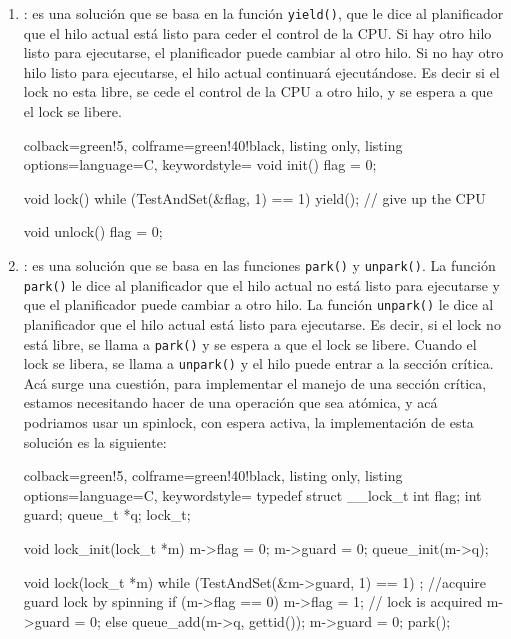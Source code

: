 \documentclass[openany]{book}
\begin{document}
\begin{enumerate}
    \item {}: es una solución que se basa en la función \texttt{yield()}, que le dice al planificador que el hilo actual está listo para ceder el control de la CPU. Si hay otro hilo listo para ejecutarse, el planificador puede cambiar al otro hilo. Si no hay otro hilo listo para ejecutarse, el hilo actual continuará ejecutándose. Es decir si el lock no esta libre, se cede el control de la CPU a otro hilo, y se espera a que el lock se libere.
    \begin{tcblisting}{colback=green!5, colframe=green!40!black, listing only, listing options={language=C, keywordstyle=\color{blue!35!white}\bfseries}}
    void init() {
        flag = 0;
    }
            
    void lock() {
        while (TestAndSet(&flag, 1) == 1)
            yield(); // give up the CPU
    }
            
    void unlock() {
        flag = 0;
    }
    \end{tcblisting}
    \item {}: es una solución que se basa en las funciones \texttt{park()} y \texttt{unpark()}. La función \texttt{park()} le dice al planificador que el hilo actual no está listo para ejecutarse y que el planificador puede cambiar a otro hilo. La función \texttt{unpark()} le dice al planificador que el hilo actual está listo para ejecutarse. Es decir, si el lock no está libre, se llama a \texttt{park()} y se espera a que el lock se libere. Cuando el lock se libera, se llama a \texttt{unpark()} y el hilo puede entrar a la sección crítica. Acá surge una cuestión, para implementar el manejo de una sección crítica, estamos necesitando hacer de una operación que sea atómica, y acá podriamos usar un spinlock, con espera activa, la implementación de esta solución es la siguiente:
    \begin{tcblisting}{colback=green!5, colframe=green!40!black, listing only, listing options={language=C, keywordstyle=\color{blue!35!white}\bfseries}}
    typedef struct __lock_t {
        int flag;
        int guard;
        queue_t *q;
    } lock_t;

    void lock_init(lock_t *m) {
        m->flag = 0;
        m->guard = 0;
        queue_init(m->q);
    }

    void lock(lock_t *m) {
        while (TestAndSet(&m->guard, 1) == 1)
            ; //acquire guard lock by spinning
        if (m->flag == 0) {
            m->flag = 1; // lock is acquired
            m->guard = 0;
        } else {
            queue_add(m->q, gettid());
            m->guard = 0;
            park();
        }
    }
    

\end{tcblisting}
\end{enumerate}
\end{document}

